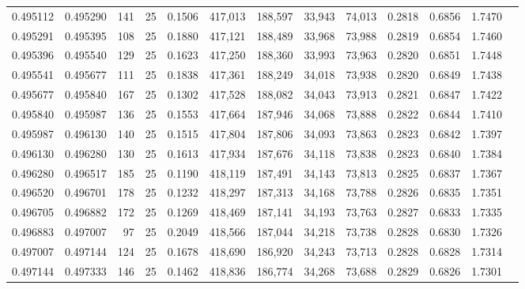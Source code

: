 \begin{tabular}{rrrrrrrrrrrrr}
0.495112 & 0.495290 &   141 &  25 &                                     0.1506 & 417,013 & 188,597 &  33,943 &  74,013 & 0.2818 & 0.6856 & 1.7470 \\
0.495291 & 0.495395 &   108 &  25 &                                     0.1880 & 417,121 & 188,489 &  33,968 &  73,988 & 0.2819 & 0.6854 & 1.7460 \\
0.495396 & 0.495540 &   129 &  25 &                                     0.1623 & 417,250 & 188,360 &  33,993 &  73,963 & 0.2820 & 0.6851 & 1.7448 \\
0.495541 & 0.495677 &   111 &  25 &                                     0.1838 & 417,361 & 188,249 &  34,018 &  73,938 & 0.2820 & 0.6849 & 1.7438 \\
0.495677 & 0.495840 &   167 &  25 &                                     0.1302 & 417,528 & 188,082 &  34,043 &  73,913 & 0.2821 & 0.6847 & 1.7422 \\
0.495840 & 0.495987 &   136 &  25 &                                     0.1553 & 417,664 & 187,946 &  34,068 &  73,888 & 0.2822 & 0.6844 & 1.7410 \\
0.495987 & 0.496130 &   140 &  25 &                                     0.1515 & 417,804 & 187,806 &  34,093 &  73,863 & 0.2823 & 0.6842 & 1.7397 \\
0.496130 & 0.496280 &   130 &  25 &                                     0.1613 & 417,934 & 187,676 &  34,118 &  73,838 & 0.2823 & 0.6840 & 1.7384 \\
0.496280 & 0.496517 &   185 &  25 &                                     0.1190 & 418,119 & 187,491 &  34,143 &  73,813 & 0.2825 & 0.6837 & 1.7367 \\
0.496520 & 0.496701 &   178 &  25 &                                     0.1232 & 418,297 & 187,313 &  34,168 &  73,788 & 0.2826 & 0.6835 & 1.7351 \\
0.496705 & 0.496882 &   172 &  25 &                                     0.1269 & 418,469 & 187,141 &  34,193 &  73,763 & 0.2827 & 0.6833 & 1.7335 \\
0.496883 & 0.497007 &    97 &  25 &                                     0.2049 & 418,566 & 187,044 &  34,218 &  73,738 & 0.2828 & 0.6830 & 1.7326 \\
0.497007 & 0.497144 &   124 &  25 &                                     0.1678 & 418,690 & 186,920 &  34,243 &  73,713 & 0.2828 & 0.6828 & 1.7314 \\
0.497144 & 0.497333 &   146 &  25 &                                     0.1462 & 418,836 & 186,774 &  34,268 &  73,688 & 0.2829 & 0.6826 & 1.7301 \\

\end{tabular}

